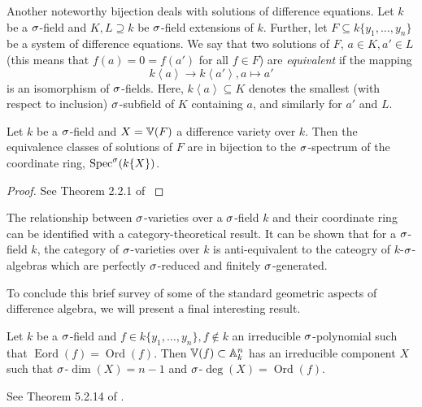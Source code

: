 Another noteworthy bijection deals with solutions of difference equations.
Let $k$ be a $\sigma$-field and $K,L \supseteq k$ be $\sigma$-field extensions of $k$. Further, let $F \subseteq k\{y_1,\ldots,y_n\}$ be a system of difference equations. We say that two solutions of $F$, $a \in K, a' \in L$ (this means that $f(a) = 0 = f(a')$ for all $f \in F$) are \emph{equivalent} if the mapping $$k\left<a\right> \rightarrow k\left<a'\right>, a \mapsto a'$$ is an isomorphism of $\sigma$-fields. Here, $k\left< a \right> \subseteq K$ denotes the smallest (with respect to inclusion) $\sigma$-subfield of $K$ containing $a$, and similarly for $a'$ and $L$.

\begin{prop}
Let $k$ be a $\sigma$-field and $X = \mathbb{V}(F)$ a difference variety over $k$. Then the equivalence classes of solutions of $F$
are in bijection to the $\sigma$-spectrum of the coordinate ring, $\operatorname{Spec}^\sigma(k\{X\})$.
\begin{proof} See Theorem 2.2.1 of \cite{wibmer}
\end{proof}
\end{prop}

The relationship between $\sigma$-varieties over a $\sigma$-field $k$ and their coordinate ring can be identified with a category-theoretical result.
It can be shown that for a $\sigma$-field $k$, the category of $\sigma$-varieties over $k$ is anti-equivalent to the cateogry of $k$-$\sigma$-algebras which are perfectly $\sigma$-reduced and finitely $\sigma$-generated.

To conclude this brief survey of some of the standard geometric aspects of difference algebra, we will present a final interesting result.

\begin{theorem}\label{irredcomp}
Let $k$ be a $\sigma$-field and $f \in k\{y_1,\ldots,y_n\}, f \notin k$ an irreducible $\sigma$-polynomial such that $\operatorname{Eord}(f) = \operatorname{Ord}(f)$. Then $\mathbb{V}(f) \subset \mathbb{A}_k^n$ has an irreducible component $X$ such that $\sigma$-$\dim(X) = n-1$ and $\sigma$-$\operatorname{deg}(X) = \operatorname{Ord}(f)$.
\begin{bew}
See Theorem 5.2.14 of \cite{wibmer}.
\end{bew}
\end{theorem}
